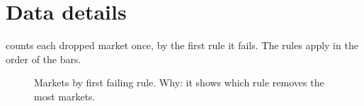 \section{Data details}\label{sec:app-data}
 counts each dropped market once, by the first rule it fails.
The rules apply in the order of the bars.

\begin{figure}[H]
\centering
{}
\caption{Markets by first failing rule. Why: it shows which rule removes the most markets.}%
\label{fig:drops}
\end{figure}
